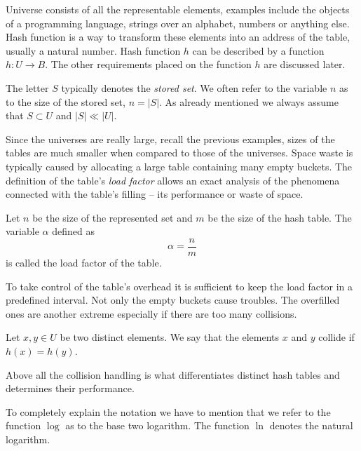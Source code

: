 Universe consists of all the representable elements, examples include the objects of a programming language, strings over an alphabet, numbers or anything else. Hash function is a way to transform these elements into an address of the table, usually a natural number. Hash function $h$ can be described by a function $h: U \rightarrow B$. The other requirements placed on the function $h$ are discussed later.

The letter $S$ typically denotes the \emph{stored set}. We often refer to the variable $n$ as to the size of the stored set, $n = |S|$. As already mentioned we always assume that $S \subset U$ and $|S| \ll |U|$.

Since the universes are really large, recall the previous examples, sizes of the tables are much smaller when compared to those of the universes. Space waste is typically caused by allocating a large table containing many empty buckets. The definition of the table's \emph{load factor} allows an exact analysis of the phenomena connected with the table's filling -- its performance or waste of space.

\begin{definition}
\label{definition-load-factor}
Let $n$ be the size of the represented set and $m$ be the size of the hash table. The variable $\alpha$ defined as \[ \alpha = \frac{n}{m} \] is called the load factor of the table.
\end{definition}

To take control of the table's overhead it is sufficient to keep the load factor in a predefined interval. Not only the empty buckets cause troubles. The overfilled ones are another extreme especially if there are too many collisions.
\begin{definition}[Collision]
\label{definition-collision}
Let $x, y \in U$ be two distinct elements. We say that the elements $x$ and $y$ collide if $h(x) = h(y)$.
\end{definition}

Above all the collision handling is what differentiates distinct hash tables and determines their performance.

To completely explain the notation we have to mention that we refer to the function $\log$ as to the base two logarithm. The function $\ln$ denotes the natural logarithm.

